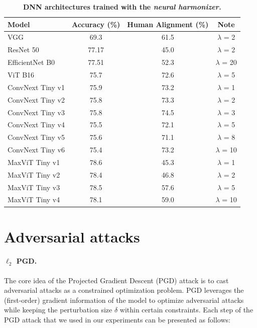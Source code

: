 \documentclass{article}
\theoremstyle{plain}
\theoremstyle{definition}
\theoremstyle{remark}
\begin{document}
\begin{table}
\centering
\begin{tabular}{lccc} 
\hline
\textbf{Model}   & \textbf{Accuracy (\%)} & \textbf{Human Alignment (\%)} & \textbf{Note}  \\ 
\hline
VGG              & 69.3       & 61.5               & $\lambda$ = 2  \\
ResNet 50        & 77.17      & 45.0               & $\lambda$ = 2 \\
EfficientNet B0  & 77.51      & 52.3               & $\lambda$ = 20\\
ViT B16          & 75.7       & 72.6               & $\lambda$ = 5 \\
ConvNext Tiny v1 & 75.9       & 73.2               & $\lambda$ = 1 \\
ConvNext Tiny v2 & 75.8       & 73.3               & $\lambda$ = 2 \\
ConvNext Tiny v3 & 75.8       & 74.5               & $\lambda$ = 3 \\
ConvNext Tiny v4 & 75.5       & 72.1               & $\lambda$ = 5 \\
ConvNext Tiny v5 & 75.6       & 71.1               & $\lambda$ = 8 \\
ConvNext Tiny v6 & 75.4       & 73.2               & $\lambda$ = 10\\
MaxViT Tiny v1   & 78.6       & 45.3               & $\lambda$ = 1 \\
MaxViT Tiny v2   & 78.4       & 46.8               & $\lambda$ = 2 \\
MaxViT Tiny v3   & 78.5       & 57.6               & $\lambda$ = 5 \\
MaxViT Tiny v4   & 78.1       & 59.0               & $\lambda$ = 10 \\ 
\hline             
\end{tabular}
\caption{ \label{si_table:neural_harmonizer} \textbf{DNN architectures trained with the \emph{neural harmonizer.}}}
\end{table}



\section{Adversarial attacks}\label{si_sec:adv_attacks}
\paragraph{$\ell_2$ PGD.} The core idea of the Projected Gradient Descent (PGD) attack is to cast adversarial attacks as a constrained optimization problem. PGD leverages the (first-order) gradient information of the model to optimize adversarial attacks while keeping the perturbation size $\delta$ within certain constraints. Each step of the PGD attack that we used in our experiments can be presented as follows:
\end{document}
